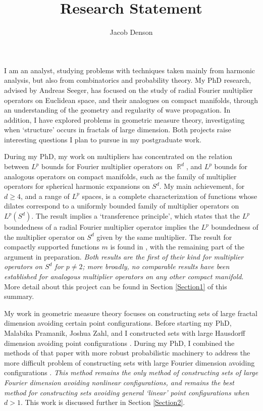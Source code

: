 \documentclass[11pt]{article}
\title{\vspace{-2em}Research Statement}
\author{Jacob Denson}
\date{}
\DeclareMathOperator{\RR}{\mathbb{R}}
\begin{document}
\maketitle

I am an analyst, studying problems with techniques taken mainly from harmonic analysis, but also from combinatorics and probability theory. My PhD research, advised by Andreas Seeger, has focused on the study of radial Fourier multiplier operators on Euclidean space, and their analogues on compact manifolds, through an understanding of the geometry and regularity of wave propagation. In addition, I have explored problems in geometric measure theory, investigating when `structure' occurs in fractals of large dimension. Both projects raise interesting questions I plan to pursue in my postgraduate work.

During my PhD, my work on multipliers has concentrated on the relation between $L^p$ bounds for Fourier multiplier operators on $\RR^d$, and $L^p$ bounds for analogous operators on compact manifolds, such as the family of multiplier operators for spherical harmonic expansions on $S^d$. My main achievement, for $d \geq 4$, and a range of $L^p$ spaces, is a complete characterization of functions whose dilates correspond to a uniformly bounded family of multiplier operators on $L^p(S^d)$. The result implies a `transference principle', which states that the $L^p$ boundedness of a radial Fourier multiplier operator implies the $L^p$ boundedness of the multiplier operator on $S^d$ given by the same multiplier. %
The result for compactly supported functions $m$ is found in \cite{DensonCharacterization}, with the remaining part of the argument in preparation. \emph{Both results are the first of their kind for multiplier operators on $S^d$ for $p \neq 2$; more broadly, no comparable results have been established for analogous multiplier operators on any other compact manifold}. More detail about this project can be found in Section \ref{Section1} of this summary.

%
%
%
%

My work in geometric measure theory focuses on constructing sets of large fractal dimension avoiding certain point configurations. Before starting my PhD, Malabika Pramanik, Joshua Zahl, and I constructed sets with large Hausdorff dimension avoiding point configurations \cite{DensonPramanikZahl}. During my PhD, I combined the methods of that paper with more robust probabilistic machinery to address the more difficult problem of constructing sets with large Fourier dimension avoiding configurations \cite{DensonFourier}. \emph{This method remains the only method of constructing sets of large Fourier dimension avoiding nonlinear configurations, and remains the best method for constructing sets avoiding general `linear' point configurations when $d > 1$}. This work is discussed further in Section \ref{Section2}.
\end{document}
